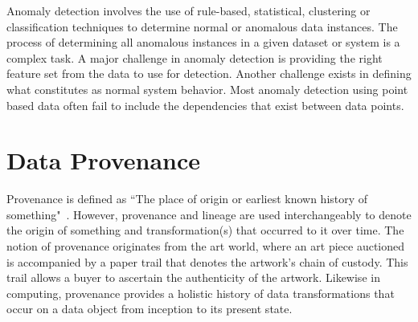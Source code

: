 


Anomaly detection involves the use of rule-based, statistical, clustering or classification techniques to determine normal or anomalous data instances. The process of determining all anomalous instances in a given dataset or system is a complex task. A major challenge in anomaly detection is providing the right feature set from the data to use for detection. Another challenge exists in defining what constitutes as normal system behavior. Most anomaly detection using point based data often fail to include the dependencies that exist between data points.   

\section{Data Provenance}

Provenance is defined as ``The place of origin or earliest known history of something"~\cite{TCDP1999}. However, provenance and lineage are used interchangeably to denote the origin of something and transformation(s) that occurred to it over time. The notion of provenance originates from the art world, where an art piece auctioned is accompanied by a paper trail that denotes the artwork's chain of custody. This trail allows a buyer to ascertain the authenticity of the artwork. Likewise in computing, provenance provides a holistic history of data transformations that occur on a data object from inception to its present state. 


